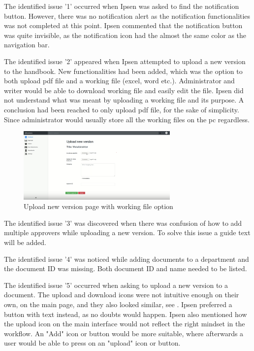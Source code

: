 \documentclass[../../master.tex]{subfiles}
\begin{document}
The identified issue '1' occurred when Ipsen was asked to find the notification button.
However, there was no notification alert as the notification functionalities was not completed at this point.
Ipsen commented that the notification button was quite invisible, as the notification icon had the almost the same color as the navigation bar.

The identified issue '2' appeared when Ipsen attempted to upload a new version to the handbook.
New functionalities had been added, which was the option to both upload pdf file and a working file (excel, word etc.).
Administrator and writer would be able to download working file and easily edit the file.
Ipsen did not understand what was meant by uploading a working file and its purpose.
A conclusion had been reached to only upload pdf file, for the sake of simplicity.
Since administrator would usually store all the working files on the pc regardless.

\begin{figure}[H]
	\centering
		\includegraphics[width=0.7\textwidth]{billeder/WorkingFile.png}
	\caption{Upload new version page with working file option}\label{fig:WorkingFile}
\end{figure}

The identified issue '3' was discovered when there was confusion of how to add multiple approvers while uploading a new version.
To solve this issue a guide text will be added.

The identified issue '4' was noticed while adding documents to a department and the document ID was missing.
Both document ID and name needed to be listed.

The identified issue '5' occurred when asking to upload a new version to a document.
The upload and download icons were not intuitive enough on their own, on the main page, and they also looked similar, see .
Ipsen preferred a button with text instead, as no doubts would happen.
Ipsen also mentioned how the upload icon on the main interface would not reflect the right mindset in the workflow.
An "Add" icon or button would be more suitable, where afterwards a user would be able to press on an "upload" icon or button.
\end{document}
